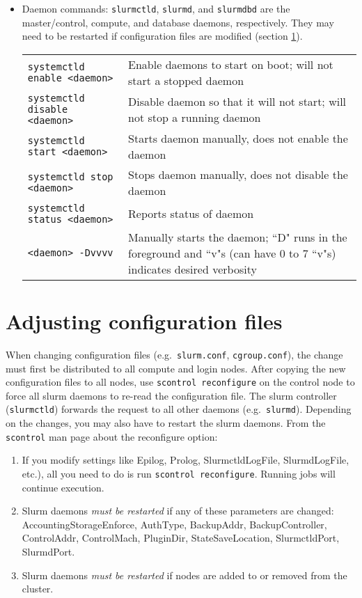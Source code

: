 \begin{itemize}
\item Daemon commands: \texttt{slurmctld}, \texttt{slurmd}, and \texttt{slurmdbd} are the master/control, compute, and database daemons, respectively. They may need to be restarted if configuration files are modified (section \ref{sec:slurmconfig}). \\
\begin{tabular}{l p{3.8in}}
\texttt{systemctld enable <daemon>} & Enable daemons to start on boot; will not start a stopped daemon \\
\texttt{systemctld disable <daemon>} & Disable daemon so that it will not start; will not stop a running daemon \\
\texttt{systemctld start <daemon>} & Starts daemon manually, does not enable the daemon \\
\texttt{systemctld stop <daemon>} & Stops daemon manually, does not disable the daemon \\
\texttt{systemctld status <daemon>} & Reports status of daemon \\
\texttt{<daemon> -Dvvvv} & Manually starts the daemon; ``D" runs in the foreground and ``v"s (can have 0 to 7 ``v"s) indicates desired verbosity \\
\end{tabular}

\end{itemize}

\section{Adjusting configuration files} \label{sec:slurmconfig}

When changing configuration files (e.g.\ \texttt{slurm.conf}, \texttt{cgroup.conf}), the change must first be distributed to all compute and login nodes. After copying the new configuration files to all nodes, use \texttt{scontrol reconfigure} on the control node to force all slurm daemons to re-read the configuration file. The slurm controller (\texttt{slurmctld}) forwards the request to all other daemons (e.g.\ \texttt{slurmd}). Depending on the changes, you may also have to restart the slurm daemons. From the \texttt{scontrol} man page about the reconfigure option:

\begin{enumerate}
\item If you modify settings like Epilog, Prolog, SlurmctldLogFile, SlurmdLogFile, etc.), all you need to do is run \texttt{scontrol reconfigure}. Running jobs will continue execution.
\item Slurm daemons \emph{must be restarted} if any of these parameters are changed: AccountingStorageEnforce, AuthType, BackupAddr, BackupController, ControlAddr, ControlMach, PluginDir, StateSaveLocation, SlurmctldPort, SlurmdPort.
\item Slurm daemons \emph{must be restarted} if nodes are added to or removed from the cluster.
\end{enumerate}

